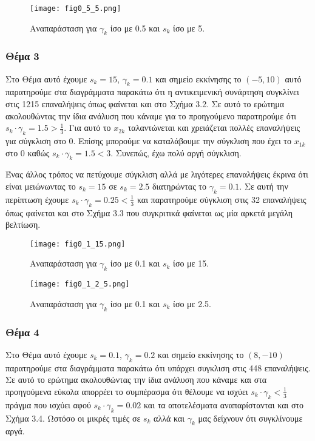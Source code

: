 \documentclass[a4paper,12pt]{report}
\begin{document}
\begin{figure}[ht!]
    \centering
    \texttt{[image: fig0\_5\_5.png]} 
    \caption{Αναπαράσταση για \(\gamma_k\) ίσο με 0.5 και \(s_k\) ίσο με 5.}
\end{figure}

\subsubsection*{Θέμα 3}
Στο Θέμα αυτό έχουμε \(s_k = 15\), \(\gamma_k = 0.1\) και σημείο εκκίνησης το \((-5, 10)\) αυτό παρατηρούμε στα διαγράμματα παρακάτω ότι η αντικειμενική συνάρτηση συγκλίνει στις 1215 επαναλήψεις όπως φαίνεται και στο Σχήμα 3.2. Σε αυτό το ερώτημα ακολουθώντας την ίδια ανάλυση που κάναμε για το προηγούμενο παρατηρούμε ότι \(s_k \cdot \gamma_k = 1.5 > \frac{1}{3}\). Για αυτό το \(x_{2k}\) ταλαντώνεται και χρειάζεται πολλές επαναλήψεις για σύγκλιση στο 0. Επίσης μπορούμε να καταλάβουμε την σύγκλιση που έχει το \(x_{1k}\) στο 0 καθώς \(s_k \cdot \gamma_k = 1.5 < 3\). Συνεπώς, έχω πολύ αργή σύγκλιση.

\vspace{0.5cm}

\hspace{-0.6cm}Ένας άλλος τρόπος να πετύχουμε σύγκλιση αλλά με λιγότερες επαναλήψεις έκρινα ότι είναι μειώνωντας το \(s_k = 15\) σε \(s_k = 2.5\) διατηρώντας το \(\gamma_k = 0.1\). Σε αυτή την περίπτωση έχουμε \(s_k \cdot \gamma_k = 0.25 < \frac{1}{3}\) και παρατηρούμε σύγκλιση στις 32 επαναλήψεις όπως φαίνεται και στο Σχήμα 3.3 που συγκριτικά φαίνεται ως μία αρκετά μεγάλη βελτίωση.

\begin{figure}[ht!]
    \centering
    \texttt{[image: fig0\_1\_15.png]} 
    \caption{Αναπαράσταση για \(\gamma_k\) ίσο με 0.1 και \(s_k\) ίσο με 15.}
\end{figure}

\begin{figure}[ht!]
    \centering
    \texttt{[image: fig0\_1\_2\_5.png]} 
    \caption{Αναπαράσταση για \(\gamma_k\) ίσο με 0.1 και \(s_k\) ίσο με 2.5.}
\end{figure}

\clearpage

\subsubsection*{Θέμα 4}
Στο Θέμα αυτό έχουμε \(s_k = 0.1\), \(\gamma_k = 0.2\) και σημείο εκκίνησης το \((8, -10)\) παρατηρούμε στα διαγράμματα παρακάτω ότι υπάρχει συγκλιση στις 448 επαναλήψεις. Σε αυτό το ερώτημα ακολουθώντας την ίδια ανάλυση που κάναμε και στα προηγούμενα εύκολα απορρέει το συμπέρασμα ότι θέλουμε να ισχύει \(s_k \cdot \gamma_k < \frac{1}{3}\) πράγμα που ισχύει αφού \(s_k \cdot \gamma_k = 0.02\) και τα αποτελέσματα αναπαρίστανται και στο Σχήμα 3.4. Ωστόσο οι μικρές τιμές σε \(s_k\) αλλά και \(\gamma_k\) μας δείχνουν ότι συγκλίνουμε αργά. 
\end{document}
